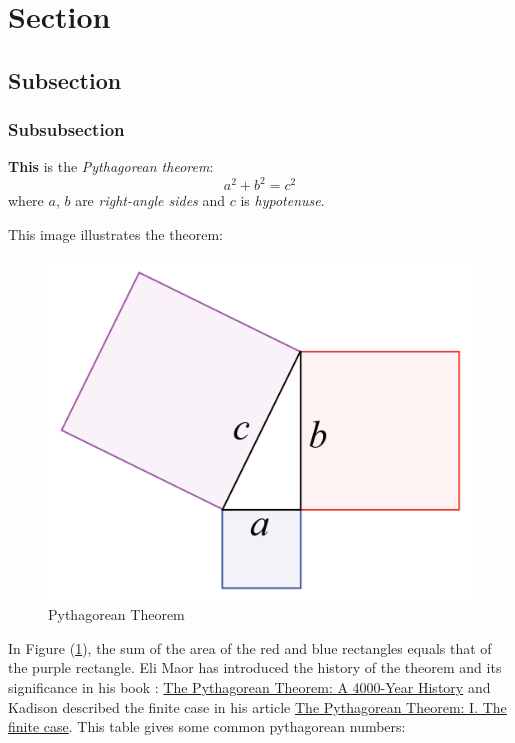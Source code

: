 \documentclass{article} %
\title{\ttfamily{Example}}
\author{\sffamily{jan\_chen}}
\date{\texttt{September 2023}}
\begin{document}
\maketitle

\tableofcontents

\section{Section}
\subsection{Subsection}
\subsubsection{Subsubsection}

{\large \textbf{This}} is the \textit{Pythagorean theorem}:
\begin{equation}
    a^2 + b^2 = c^2
\end{equation}
where $a$, $b$ are \textit{right-angle sides} and $c$ is \textit{hypotenuse}.

This image illustrates the theorem:
\begin{figure}[H]
    \centering
    \includegraphics[scale = 0.06]{image/pythagorean th.png}
    \caption{Pythagorean Theorem}
    \label{pt}
\end{figure}

In Figure (\ref{pt}), the sum of the area of the red and blue rectangles equals that of the purple rectangle. Eli Maor has introduced the history of the theorem and its significance in his book \cite{ref1}: \href{https://books.google.com.sg/books?id=XuWZDwAAQBAJ&dq=pythagorean+theorem&lr=&hl=zh-CN&source=gbs_navlinks_s}{The Pythagorean Theorem: A 4000-Year History} and Kadison described the finite case in his article \cite{ref2} \href{https://doi.org/10.1073/pnas.032677199}{The Pythagorean Theorem: I. The finite case}.
This table gives some common pythagorean numbers:
\end{document}
